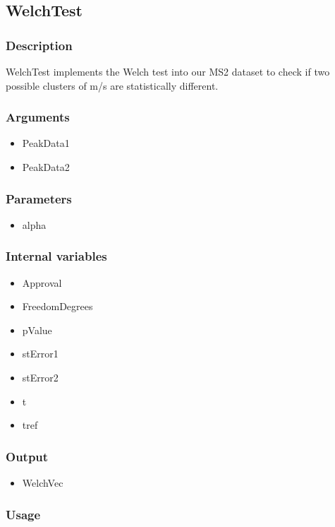 \subsection{WelchTest}
\subsubsection{Description}

WelchTest implements the Welch test into our MS2 dataset to check if two possible clusters of m/s are statistically different.
\subsubsection{Arguments}
\begin{itemize}
\item PeakData1
\item PeakData2
\end{itemize}
\subsubsection{Parameters}
\begin{itemize}
\item alpha
\end{itemize}
\subsubsection{Internal variables}
\begin{itemize}
\item Approval
\item FreedomDegrees
\item pValue
\item stError1
\item stError2
\item t
\item tref
\end{itemize}
\subsubsection{Output}
\begin{itemize}
\item WelchVec
\end{itemize}
\subsubsection{Usage}
